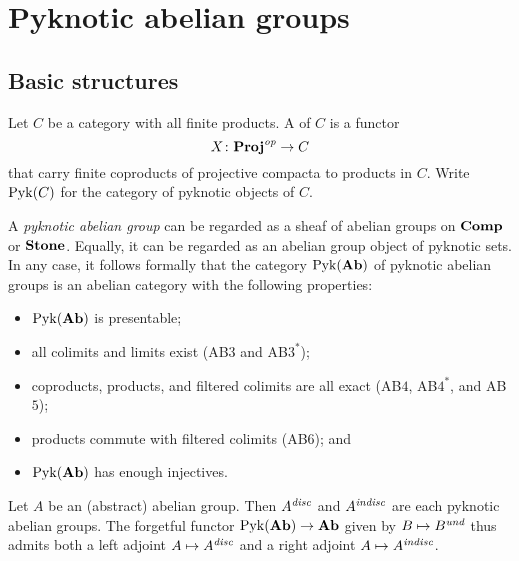 \section{Pyknotic abelian groups}

\subsection{Basic structures}

\begin{dfn}
	Let $ C $ be a category with all finite products.
	A  of $ C $ is a functor
	\[
		X \colon \textbf{\textup{Proj}}^{\textit{op}} \to  C
	\]
	that carry finite coproducts of projective compacta to products in $ C $.
	Write $ \operatorname{Pyk}(C) $ for the category of pyknotic objects of $ C $.
\end{dfn}

\begin{nul}
	A \emph{pyknotic abelian group} can be regarded as a sheaf of abelian groups on $ \textbf{\textup{Comp}} $ or $ \textbf{\textup{Stone}} $.
	Equally, it can be regarded as an abelian group object of pyknotic sets.
	In any case, it follows formally that the category $ \operatorname{Pyk}(\textbf{\textup{Ab}}) $ of pyknotic abelian groups is an abelian category with the following properties:
	\begin{itemize}
		\item $ \operatorname{Pyk}(\textbf{\textup{Ab}}) $ is presentable;
		\item all colimits and limits exist (AB$3$ and AB$3^{\ast}$);
		\item coproducts, products, and filtered colimits are all exact (AB$4$, AB$4^{\ast}$, and AB$5$);
		\item products commute with filtered colimits (AB$6$); and
		\item $ \operatorname{Pyk}(\textbf{\textup{Ab}}) $ has enough injectives.
	\end{itemize}
\end{nul}

\begin{exm}
	Let $ A $ be an (abstract) abelian group.
	Then $ A^{\textit{disc}} $ and $ A^{\textit{indisc}} $ are each pyknotic abelian groups.
	The forgetful functor $ \operatorname{Pyk}(\textbf{\textup{Ab}}) \to \textbf{\textup{Ab}} $ given by $ B \mapsto B^{\textit{und}} $ thus admits both a left adjoint $ A \mapsto A^{\textit{disc}} $ and a right adjoint $ A \mapsto A^{\textit{indisc}} $.
\end{exm}


